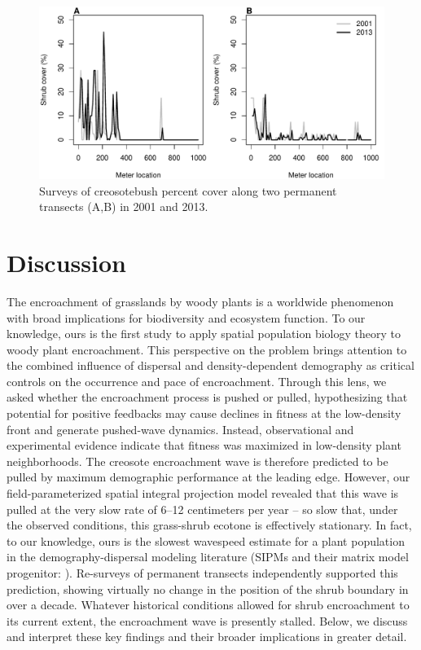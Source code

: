 \documentclass[11pt]{article}\usepackage[]{graphicx}\usepackage[usenames,dvipsnames]{xcolor}
\begin{document}
\begin{figure}[H]
  \begin{center}
    \includegraphics[width=\linewidth]{Figures/resurveys}
  \caption{Surveys of creosotebush percent cover along two permanent transects (A,B) in 2001 and 2013.}
  \label{fig:wavespeed}
  \end{center}
\end{figure}

\section*{Discussion}

The encroachment of grasslands by woody plants is a worldwide phenomenon with broad implications for biodiversity and ecosystem function. 
To our knowledge, ours is the first study to apply spatial population biology theory to woody plant encroachment. 
This perspective on the problem brings attention to the combined influence of dispersal and density-dependent demography as critical controls on the occurrence and pace of encroachment. 
Through this lens, we asked whether the encroachment process is pushed or pulled, hypothesizing that potential for positive feedbacks may cause declines in fitness at the low-density front and generate pushed-wave dynamics. 
Instead, observational and experimental evidence indicate that fitness was maximized in low-density plant neighborhoods.
The creosote encroachment wave is therefore predicted to be pulled by maximum demographic performance at the leading edge.
However, our field-parameterized spatial integral projection model revealed that this wave is pulled at the very slow rate of 6--12 centimeters per year -- so slow that, under the observed conditions, this grass-shrub ecotone is effectively stationary. 
In fact, to our knowledge, ours is the slowest wavespeed estimate for a plant population in the demography-dispersal modeling literature (SIPMs and their matrix model progenitor: \citep{neubert2000demography}). 
Re-surveys of permanent transects independently supported this prediction, showing virtually no change in the position of the shrub boundary in over a decade. 
Whatever historical conditions allowed for shrub encroachment to its current extent, the encroachment wave is presently stalled. 
Below, we discuss and interpret these key findings and their broader implications in greater detail. 
\end{document}
